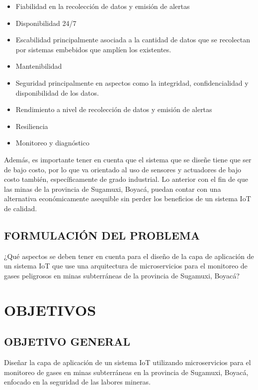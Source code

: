 \documentclass[stu,12pt,floatsintext]{apa7}
\begin{document}
	\begin{itemize}
		\item Fiabilidad en la recolección de datos y emisión de alertas
		\item Disponibilidad 24/7
		\item Escabilidad principalmente asociada a la cantidad de datos que se recolectan por sistemas embebidos que amplíen los existentes.
		\item Mantenibilidad
		\item Seguridad principalmente en aspectos como la integridad, confidencialidad y disponibilidad de los datos.
		\item Rendimiento a nivel de recolección de datos y emisión de alertas
		\item Resiliencia 
		\item Monitoreo y diagnóstico
	\end{itemize}
	Además, es importante tener en cuenta que el sistema que se diseñe tiene que ser de bajo costo, por lo que va orientado al uso de sensores y actuadores de bajo costo también, específicamente de grado industrial. Lo anterior con el fin de que las minas de la provincia de Sugamuxi, Boyacá, puedan contar con una alternativa económicamente asequible sin perder los beneficios de un sistema IoT de calidad.
	\subsection{FORMULACIÓN DEL PROBLEMA}
	¿Qué aspectos se deben tener en cuenta para el diseño de la capa de aplicación de un sistema IoT que use una arquitectura de microservicios para el monitoreo de gases peligrosos en minas subterráneas de la provincia de Sugamuxi, Boyacá?
	
	\section{OBJETIVOS}
	\subsection{OBJETIVO GENERAL}
	Diseñar la capa de aplicación de un sistema IoT utilizando microservicios para el monitoreo de gases en minas subterráneas en la provincia de Sugamuxi, Boyacá, enfocado en la seguridad de las labores mineras.
\end{document}

